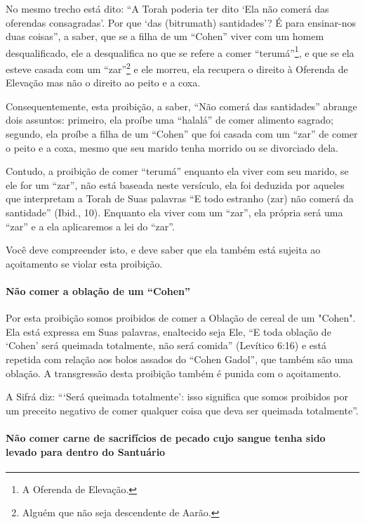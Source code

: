 No mesmo trecho está dito: ``A Torah poderia ter dito `Ela não comerá
das oferendas consagradas'. Por que `das (bitrumath) santidades'? É para
ensinar-nos duas coisas'', a saber, que se a filha de um ``Cohen'' viver
com um homem desqualificado, ele a desqualifica no que se refere a comer
``terumá''\footnote{A Oferenda de Elevação.}, e que se ela esteve casada com um
``zar''\footnote{Alguém que não seja descendente de Aarão.} e ele morreu, ela recupera o direito à
Oferenda de Elevação mas não o direito ao peito e a coxa.
 
Consequentemente, esta proibição, a saber, ``Não comerá das santidades''
abrange dois assuntos: primeiro, ela proíbe uma ``halalá'' de comer
alimento sagrado; segundo, ela proíbe a filha de um ``Cohen'' que foi
casada com um ``zar'' de comer o peito e a coxa, mesmo que seu marido
tenha morrido ou se divorciado dela.

Contudo, a proibição de comer ``terumá'' enquanto ela viver com seu
marido, se ele for um ``zar'', não está baseada neste versículo, ela foi
deduzida por aqueles que interpretam a Torah de Suas palavras ``E todo
estranho (zar) não comerá da santidade'' (Ibid., 10). Enquanto ela viver
com um ``zar'', ela própria será uma ``zar'' e a ela aplicaremos a lei
do ``zar''.

Você deve compreender isto, e deve saber que ela também está sujeita ao
açoitamento se violar esta proibição.

\paragraph{Não comer a oblação de um ``Cohen''}

Por esta proibição somos proibidos de comer a Oblação de cereal de um
"Cohen". Ela está expressa em Suas palavras, enaltecido seja Ele, ``E
toda oblação de `Cohen' será queimada totalmente, não será comida''
(Levítico 6:16) e está repetida com relação aos bolos assados do ``Cohen
Gadol'', que também são uma oblação. A transgressão desta proibição
também é punida com o açoitamento.

A Sifrá diz: ```Será queimada totalmente': isso significa que somos
proibidos por um preceito negativo de comer qualquer coisa que deva ser
queimada totalmente''.

\paragraph{Não comer carne de sacrifícios de pecado cujo sangue tenha sido
levado para dentro do Santuário}

